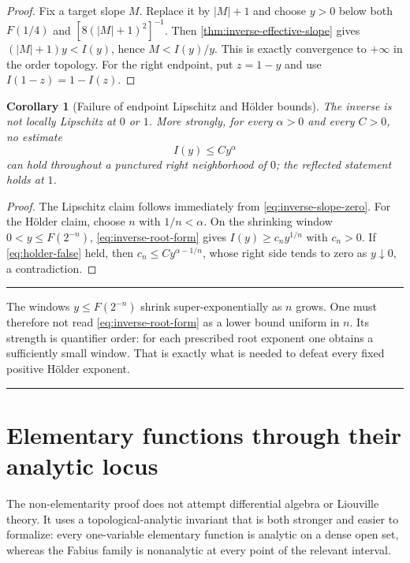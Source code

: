 \documentclass[11pt,oneside]{article}
\newtheorem{corollary}[theorem]{Corollary}
\theoremstyle{definition}
\theoremstyle{remark}
\newenvironment{boxedremark}{%
  \par\smallskip\noindent\begin{center}\begin{minipage}{0.94\textwidth}%
  \color{black}\hrule\vspace{0.6em}\small
}{%
  \vspace{0.6em}\hrule\end{minipage}\end{center}\smallskip
}
\begin{document}
\begin{proof}
Fix a target slope $M$.  Replace it by $|M|+1$ and choose $y>0$ below both
$F(1/4)$ and $[8(|M|+1)^2]^{-1}$.  Then \cref{thm:inverse-effective-slope} gives
$(|M|+1)y<I(y)$, hence $M<I(y)/y$.  This is exactly convergence to $+\infty$ in the
order topology.  For the right endpoint, put $z=1-y$ and use
$I(1-z)=1-I(z)$.
\end{proof}

\begin{corollary}[Failure of endpoint Lipschitz and H\"older bounds]
\label{cor:inverse-not-holder}
The inverse is not locally Lipschitz at $0$ or $1$.  More strongly, for every
$\alpha>0$ and every $C>0$, no estimate
\begin{equation}
 I(y)\le Cy^\alpha
 \label{eq:holder-false}
\end{equation}
can hold throughout a punctured right neighborhood of $0$; the reflected statement holds
at $1$.
\end{corollary}

\begin{proof}
The Lipschitz claim follows immediately from \eqref{eq:inverse-slope-zero}.  For the H\"older
claim, choose $n$ with $1/n<\alpha$.  On the shrinking window
$0<y\le F(2^{-n})$, \eqref{eq:inverse-root-form} gives $I(y)\ge c_ny^{1/n}$ with
$c_n>0$.  If \eqref{eq:holder-false} held, then
$c_n\le Cy^{\alpha-1/n}$, whose right side tends to zero as $y\downarrow0$, a
contradiction.
\end{proof}

\begin{boxedremark}
The windows $y\le F(2^{-n})$ shrink super-exponentially as $n$ grows.  One must therefore
not read \eqref{eq:inverse-root-form} as a lower bound uniform in $n$.  Its strength is
quantifier order: for each prescribed root exponent one obtains a sufficiently small window.
That is exactly what is needed to defeat every fixed positive H\"older exponent.
\end{boxedremark}

\section{Elementary functions through their analytic locus}
\label{sec:elementary}

The non-elementarity proof does not attempt differential algebra or Liouville theory.  It
uses a topological-analytic invariant that is both stronger and easier to formalize: every
one-variable elementary function is analytic on a dense open set, whereas the Fabius family
is nonanalytic at every point of the relevant interval.
\end{document}
